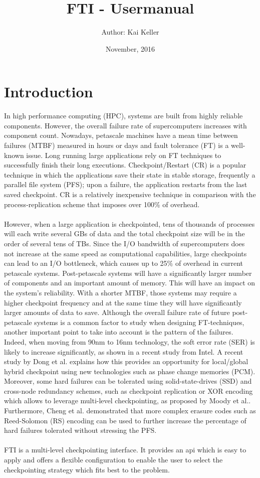 \documentclass{refrep}
\title{FTI - Usermanual}
\author{Author: Kai Keller}
\date{November, 2016}
\begin{document}
\maketitle
\tableofcontents
\newpage
\chapter{Introduction}\label{ch:introduction}
In high performance computing (HPC), systems are built from highly reliable components. However, the overall failure rate of supercomputers increases with component count. Nowadays, petascale machines have a mean time between failures (MTBF) measured in hours or days and fault tolerance (FT) is a well-known issue. Long running large applications rely on FT techniques to successfully finish their long executions. Checkpoint/Restart (CR) is a popular technique in which the applications save their state in stable storage, frequently a parallel file system (PFS); upon a failure, the application restarts from the last saved checkpoint. CR is a relatively inexpensive technique in comparison with the process-replication scheme that imposes over 100\% of overhead.
\\{}\\
However, when a large application is checkpointed, tens of thousands of processes will each write several GBs of data and the total checkpoint size will be in the order of several tens of TBs. Since the I/O bandwidth of supercomputers does not increase at the same speed as computational capabilities, large checkpoints can lead to an I/O bottleneck, which causes up to 25\% of overhead in current petascale systems. Post-petascale systems will have a significantly larger number of components and an important amount of memory. This will have an impact on the system’s reliability. With a shorter MTBF, those systems may require a higher checkpoint frequency and at the same time they will have significantly larger amounts of data to save. Although the overall failure rate of future post-petascale systems is a common factor to study when designing FT-techniques, another important point to take into account is the pattern of the failures. Indeed, when moving from 90nm to 16nm technology, the soft error rate (SER) is likely to increase significantly, as shown in a recent study from Intel. A recent study by Dong et al. explains how this provides an opportunity for local/global hybrid checkpoint using new technologies such as phase change memories (PCM). Moreover, some hard failures can be tolerated using solid-state-drives (SSD) and cross-node redundancy schemes, such as checkpoint replication or XOR encoding which allows to leverage multi-level checkpointing, as proposed by Moody et al.. Furthermore, Cheng et al. demonstrated that more complex erasure codes such as Reed-Solomon (RS) encoding can be used to further increase the percentage of hard failures tolerated without stressing the PFS.
\\{}\\
FTI is a multi-level checkpointing interface. It provides an api which is easy to apply and offers a flexible configuration to enable the user to select the checkpointing strategy which fits best to the problem.
\end{document}
